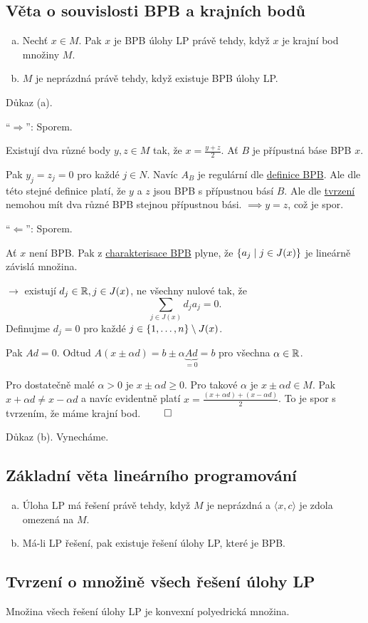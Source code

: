 \subsection{Věta o souvislosti BPB a krajních bodů}
\begin{enumerate}[(a)]
    \item Nechť $x \in M$. Pak $x$ je BPB úlohy LP právě tehdy, když $x$ je krajní bod množiny $M$.
    \item $M$ je neprázdná právě tehdy, když existuje BPB úlohy LP.
\end{enumerate}

Důkaz (a).

\enquote{$\Rightarrow$}: Sporem.

Existují dva různé body $y, z \in M$ tak, že $x = \frac{y+z}{2}$. Ať $B$ je přípustná báse BPB $x$.

Pak $y_j = z_j = 0$ pro každé $j \in N$. Navíc $A_B$ je regulární dle \hyperref[BPB]{definice BPB}. Ale dle této stejné 
definice platí, že $y$ a $z$ jsou BPB s přípustnou básí $B$. Ale dle \hyperref[ruzneBPB]{tvrzení} nemohou mít dva různé
BPB stejnou přípustnou bási. $\implies y = z$, což je spor.

\enquote{$\Leftarrow$}: Sporem.

Ať $x$ není BPB. Pak z \hyperref[charBPB]{charakterisace BPB} plyne, že $\left\lbrace a_j \mid j \in J(x) \right\rbrace$ je lineárně závislá 
množina.

$\rightarrow$ existují $d_j \in \mathbb{R}, j \in J(x)$, ne všechny nulové tak, že 
\[
    \sum_{j\in J(x)} d_j a_j = 0.
\]
Definujme $d_j = 0$ pro každé $j \in \left\lbrace 1, \dots, n \right\rbrace \setminus J(x)$.

Pak $A d = 0$. Odtud $A(x\pm \alpha d) = b \pm \alpha \underbrace{A d}_{=0} = b$ pro všechna $\alpha \in \mathbb{R}$.

Pro dostatečně malé $\alpha > 0$ je $x \pm \alpha d \geq 0$. Pro takové $\alpha$ je $x \pm \alpha d \in M$. Pak 
$x + \alpha d \not = x - \alpha d$ a navíc evidentně platí $x = \frac{(x+\alpha d) + (x - \alpha d)}{2}$. To je spor s 
tvrzením, že máme krajní bod. $\qed$

Důkaz (b). Vynecháme.

\subsection{Základní věta lineárního programování}
\begin{enumerate}[(a)]
    \item Úloha LP má řešení právě tehdy, když $M$ je neprázdná a $\langle x, c\rangle$ je zdola omezená na $M$.
    \item Má-li LP řešení, pak existuje řešení úlohy LP, které je BPB.
\end{enumerate}

\subsection{Tvrzení o množině všech řešení úlohy LP}
Množina všech řešení úlohy LP je konvexní polyedrická množina. 